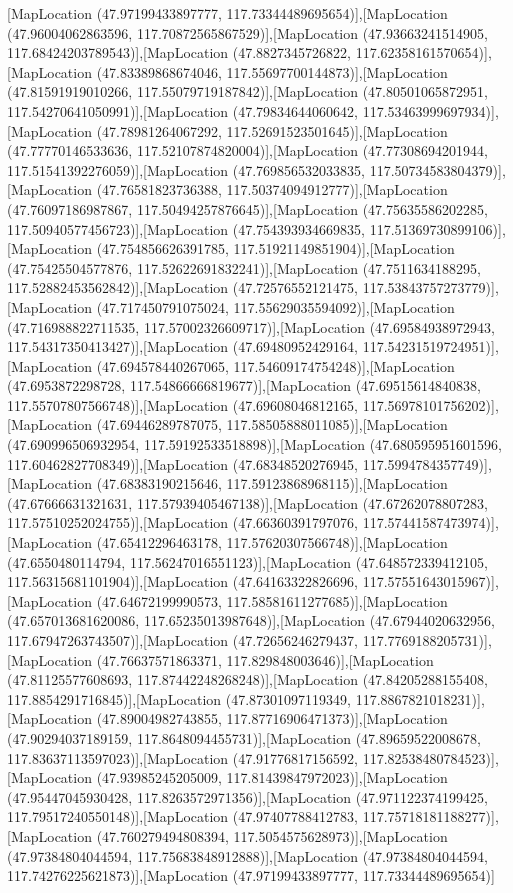 [MapLocation (47.97199433897777, 117.73344489695654)],[MapLocation (47.96004062863596, 117.70872565867529)],[MapLocation (47.93663241514905, 117.68424203789543)],[MapLocation (47.8827345726822, 117.62358161570654)],[MapLocation (47.83389868674046, 117.55697700144873)],[MapLocation (47.81591919010266, 117.55079719187842)],[MapLocation (47.80501065872951, 117.54270641050991)],[MapLocation (47.79834644060642, 117.53463999697934)],[MapLocation (47.78981264067292, 117.52691523501645)],[MapLocation (47.77770146533636, 117.52107874820004)],[MapLocation (47.77308694201944, 117.51541392276059)],[MapLocation (47.769856532033835, 117.50734583804379)],[MapLocation (47.76581823736388, 117.50374094912777)],[MapLocation (47.76097186987867, 117.50494257876645)],[MapLocation (47.75635586202285, 117.50940577456723)],[MapLocation (47.754393934669835, 117.51369730899106)],[MapLocation (47.754856626391785, 117.51921149851904)],[MapLocation (47.75425504577876, 117.52622691832241)],[MapLocation (47.7511634188295, 117.52882453562842)],[MapLocation (47.72576552121475, 117.53843757273779)],[MapLocation (47.717450791075024, 117.55629035594092)],[MapLocation (47.716988822711535, 117.57002326609717)],[MapLocation (47.69584938972943, 117.54317350413427)],[MapLocation (47.69480952429164, 117.54231519724951)],[MapLocation (47.694578440267065, 117.54609174754248)],[MapLocation (47.6953872298728, 117.54866666819677)],[MapLocation (47.69515614840838, 117.55707807566748)],[MapLocation (47.69608046812165, 117.56978101756202)],[MapLocation (47.69446289787075, 117.58505888011085)],[MapLocation (47.690996506932954, 117.59192533518898)],[MapLocation (47.680595951601596, 117.60462827708349)],[MapLocation (47.68348520276945, 117.5994784357749)],[MapLocation (47.68383190215646, 117.59123868968115)],[MapLocation (47.67666631321631, 117.57939405467138)],[MapLocation (47.67262078807283, 117.57510252024755)],[MapLocation (47.66360391797076, 117.57441587473974)],[MapLocation (47.65412296463178, 117.57620307566748)],[MapLocation (47.6550480114794, 117.56247016551123)],[MapLocation (47.648572339412105, 117.56315681101904)],[MapLocation (47.64163322826696, 117.57551643015967)],[MapLocation (47.64672199990573, 117.58581611277685)],[MapLocation (47.657013681620086, 117.65235013987648)],[MapLocation (47.67944020632956, 117.67947263743507)],[MapLocation (47.72656246279437, 117.7769188205731)],[MapLocation (47.76637571863371, 117.829848003646)],[MapLocation (47.81125577608693, 117.87442248268248)],[MapLocation (47.84205288155408, 117.8854291716845)],[MapLocation (47.87301097119349, 117.8867821018231)],[MapLocation (47.89004982743855, 117.87716906471373)],[MapLocation (47.90294037189159, 117.8648094455731)],[MapLocation (47.89659522008678, 117.83637113597023)],[MapLocation (47.91776817156592, 117.82538480784523)],[MapLocation (47.93985245205009, 117.81439847972023)],[MapLocation (47.95447045930428, 117.8263572971356)],[MapLocation (47.971122374199425, 117.79517240550148)],[MapLocation (47.97407788412783, 117.75718181188277)],[MapLocation (47.760279494808394, 117.5054575628973)],[MapLocation (47.97384804044594, 117.75683848912888)],[MapLocation (47.97384804044594, 117.74276225621873)],[MapLocation (47.97199433897777, 117.73344489695654)]